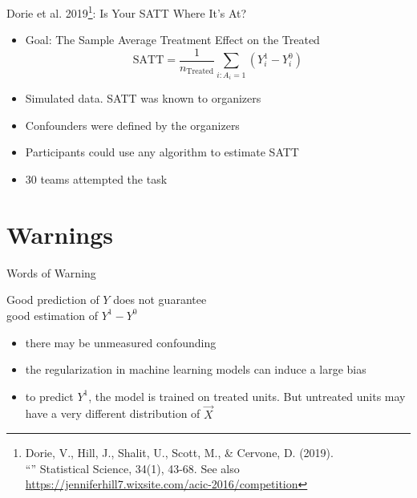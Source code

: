 \documentclass{beamer}
\newcommand\blue[1]{\color{blue}#1}
\newcommand\bref[2]{\href{#1}{\color{blue}{#2}}}
\begin{document}
\begin{frame}{Dorie et al. 2019\footnote{
Dorie, V., Hill, J., Shalit, U., Scott, M., \& Cervone, D. (2019).\\
``\bref{https://projecteuclid.org/journals/statistical-science/volume-34/issue-1/Automated-versus-Do-It-Yourself-Methods-for-Causal-Inference/10.1214/18-STS667.full}{Automated versus do-it-yourself methods for causal inference: Lessons learned from a data analysis competition.}'' Statistical Science, 34(1), 43-68. See also \blue{\url{https://jenniferhill7.wixsite.com/acic-2016/competition}}}: Is Your SATT Where It's At?}

\begin{itemize} \pause
\item Goal: The Sample Average Treatment Effect on the Treated
$$\text{SATT} = \frac{1}{n_\text{Treated}}\sum_{i:A_i = 1} \left(Y_i^1 - Y_i^0\right)$$ \pause
\item Simulated data. SATT was known to organizers \pause
\item Confounders were defined by the organizers \pause
\item Participants could use any algorithm to estimate SATT \pause
\item 30 teams attempted the task
\end{itemize}

\end{frame}

\section{Warnings}

\begin{frame}
\huge{Words of Warning}
\end{frame}

\begin{frame}{Good prediction of $Y$ does not guarantee\\good estimation of $Y^1-Y^0$} \pause

\begin{itemize}
\item there may be unmeasured confounding
\item the regularization in machine learning models can induce a large bias
\item to predict $Y^1$, the model is trained on treated units. But untreated units may have a very different distribution of $\vec{X}$
\end{itemize}

\end{frame}
\end{document}

